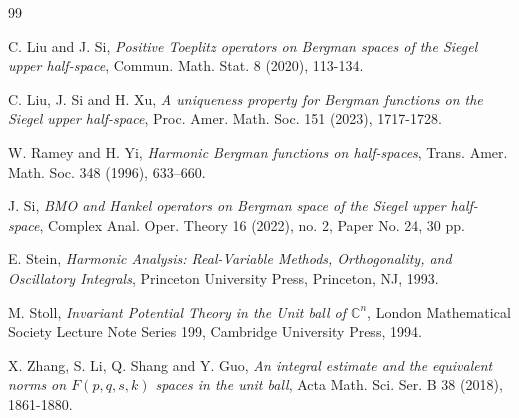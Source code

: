 \documentclass{amsart}
\numberwithin{equation}{section}
\begin{document}
\begin{thebibliography}{99}



C. Liu and J. Si, \textit{Positive Toeplitz operators on Bergman spaces of the Siegel upper half-space},
Commun. Math. Stat. 8 (2020), 113-134.

C. Liu, J. Si and H. Xu, \textit{A uniqueness property for Bergman functions on the Siegel upper half-space}, 
Proc. Amer. Math. Soc. 151 (2023), 1717-1728.



W. Ramey and H. Yi, \textit{Harmonic Bergman functions on half-spaces}, Trans. Amer. Math. Soc.
348 (1996), 633--660.




J. Si,  \textit{BMO and Hankel operators on Bergman space of the Siegel upper half-space}, Complex Anal. Oper. Theory 16 (2022), no. 2, Paper No. 24, 30 pp.


E. Stein, \textit{Harmonic Analysis: Real-Variable Methods, Orthogonality, and Oscillatory Integrals},
Princeton University Press, Princeton, NJ, 1993.

M. Stoll, \textit{Invariant Potential Theory in the Unit ball of $\mathbb{C}^n$}, London Mathematical Society Lecture Note Series 199, Cambridge University Press, 1994.

%

X. Zhang, S. Li, Q. Shang and Y. Guo, \textit{An integral estimate and the equivalent norms on $F(p,q,s,k)$ spaces in the unit ball},
Acta Math. Sci. Ser. B 38 (2018), 1861-1880.




%

\end{thebibliography}
\end{document}
